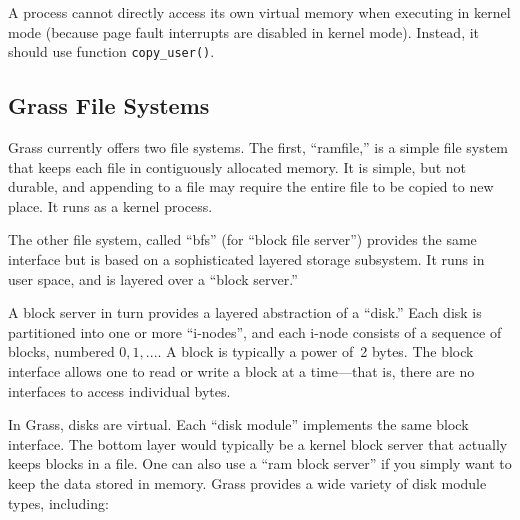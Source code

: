 \documentclass{article}
\begin{document}
A process cannot directly access its own virtual memory when executing
in kernel mode (because page fault interrupts are disabled in kernel
mode).  Instead, it should use function \texttt{copy\_user()}.

\subsection{Grass File Systems}

Grass currently offers two file systems.  The first, ``ramfile,'' 
is a simple file system that keeps each file in contiguously
allocated memory.  It is simple, but not durable, and appending
to a file may require the entire file to be copied to new place.
It runs as a kernel process.

The other file system, called ``bfs'' (for ``block file server'')
provides the same interface
but is based on a sophisticated layered storage subsystem.
It runs in user space, and is layered over a ``block server.''

A block server in turn provides a layered abstraction of a ``disk.''
Each disk is partitioned into one or more ``i-nodes'', and each i-node
consists of a sequence of blocks, numbered $0, 1, ...$. A block is 
typically a power of~2 bytes.
The block interface allows one to read or write a block
at a time---that is, there are no interfaces to access individual bytes.

In Grass, disks are virtual.
Each ``disk module'' implements the same block interface.  The bottom
layer would typically be a kernel block server that actually keeps
blocks in a file.  One can also use a ``ram block server'' if you
simply want to keep the data stored in memory.
Grass provides a wide variety of disk module types, including:
\end{document}

